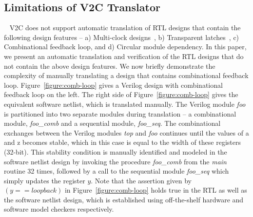 \subsection{Limitations of V2C Translator}~\label{v2clim}
%  
V2C does not support automatic translation of RTL designs that contain 
the following design features -- a) Multi-clock designs~\cite{multiclock}, 
b) Transparent latches~\cite{DBLP:conf/glvlsi/ChandraWA98}, 
c) Combinational feedback loop, and d) Circular module dependency. 
%  
%
In this paper, we present an automatic translation and verification 
of the RTL designs that do not contain the above design features.   
%  
We now briefly demonstrate the complexity of manually translating 
a design that contains combinational feedback loop.  
Figure~\ref{figure:comb-loop} gives a Verilog design with 
combinational feedback loop on the left.  The right side of 
Figure~\ref{figure:comb-loop} gives the equivalent software netlist, 
which is translated manually. 
%  
The Verilog module {\em foo} is partitioned into two separate modules during
translation -- a combinational module, {\em foo\_comb} and a sequential module,
{\em foo\_seq}.  The combinational exchanges between the Verilog modules {\em top}
and {\em foo} continues until the values of a and z becomes stable, which in 
this case is equal to the width of these registers (32-bit).  This stability 
condition is manually identified and modeled in the software netlist design 
by invoking the procedure {\em foo\_comb} from the {\em main} routine
32 times, followed by a call to the sequential module {\em foo\_seq} which simply
updates the register $y$.  
%  
Note that the assertion given by $(y==loopback)$ in Figure~\ref{figure:comb-loop} 
holds true in the RTL as well as the software netlist design, which is established 
using off-the-shelf hardware and software model checkers respectively.   
%
